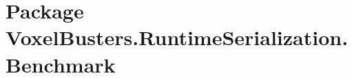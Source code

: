 \hypertarget{namespace_voxel_busters_1_1_runtime_serialization_1_1_benchmark}{}\section{Package Voxel\+Busters.\+Runtime\+Serialization.\+Benchmark}
\label{namespace_voxel_busters_1_1_runtime_serialization_1_1_benchmark}
